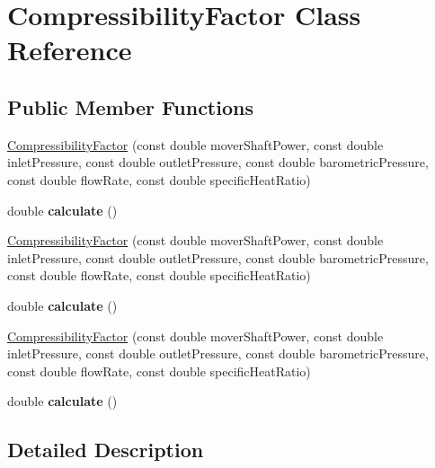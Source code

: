 \hypertarget{class_compressibility_factor}{}\section{Compressibility\+Factor Class Reference}
\label{class_compressibility_factor}
\subsection*{Public Member Functions}
\begin{DoxyCompactItemize}
\item 
\hyperlink{class_compressibility_factor_afb938d7e72ff7bcf5e979dd51f33e6b8}{Compressibility\+Factor} (const double mover\+Shaft\+Power, const double inlet\+Pressure, const double outlet\+Pressure, const double barometric\+Pressure, const double flow\+Rate, const double specific\+Heat\+Ratio)
\item 
\mbox{\label{class_compressibility_factor_a8bba71f8954f79d3eb704c7ee58a5f47}} 
double {\bfseries calculate} ()
\item 
\hyperlink{class_compressibility_factor_afb938d7e72ff7bcf5e979dd51f33e6b8}{Compressibility\+Factor} (const double mover\+Shaft\+Power, const double inlet\+Pressure, const double outlet\+Pressure, const double barometric\+Pressure, const double flow\+Rate, const double specific\+Heat\+Ratio)
\item 
\mbox{\label{class_compressibility_factor_a8bba71f8954f79d3eb704c7ee58a5f47}} 
double {\bfseries calculate} ()
\item 
\hyperlink{class_compressibility_factor_afb938d7e72ff7bcf5e979dd51f33e6b8}{Compressibility\+Factor} (const double mover\+Shaft\+Power, const double inlet\+Pressure, const double outlet\+Pressure, const double barometric\+Pressure, const double flow\+Rate, const double specific\+Heat\+Ratio)
\item 
\mbox{\label{class_compressibility_factor_a8bba71f8954f79d3eb704c7ee58a5f47}} 
double {\bfseries calculate} ()
\end{DoxyCompactItemize}


\subsection{Detailed Description}


